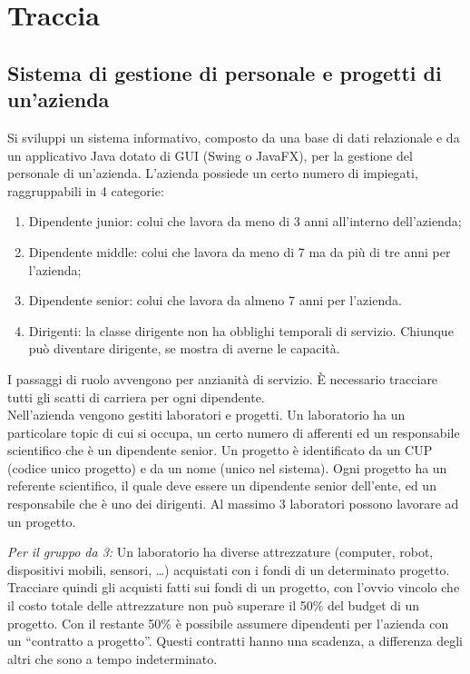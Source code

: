 \chapter[Traccia: Sistema di gestione di personale e progetti all'interno di un'azienda]{Traccia}
    \section*{Sistema di gestione di personale e progetti di un'azienda}
        Si sviluppi un sistema informativo, composto da una base di dati relazionale e da un applicativo Java dotato di GUI (Swing o JavaFX), per la gestione del personale di un’azienda. L’azienda possiede un certo numero di impiegati, raggruppabili in 4 categorie:
        \begin{enumerate}
            \item Dipendente junior: colui che lavora da meno di 3 anni all’interno dell’azienda;
            \item Dipendente middle: colui che lavora da meno di 7 ma da più di tre anni per l’azienda;
            \item Dipendente senior: colui che lavora da almeno 7 anni per l’azienda.
            \item Dirigenti: la classe dirigente non ha obblighi temporali di servizio. Chiunque può diventare dirigente, se mostra di averne le capacità.
        \end{enumerate}
        I passaggi di ruolo avvengono per anzianità di servizio. È necessario tracciare tutti gli scatti di carriera per ogni dipendente. \\
        Nell’azienda vengono gestiti laboratori e progetti. Un laboratorio ha un particolare topic di cui si occupa, un certo numero di afferenti ed un responsabile scientifico che è un dipendente senior. Un progetto è identificato da un CUP (codice unico progetto) e da un nome (unico nel sistema). Ogni progetto ha un referente scientifico, il quale deve essere un dipendente senior dell’ente, ed un responsabile che è uno dei dirigenti. Al massimo 3 laboratori possono lavorare ad un progetto.
        
        
        \textit{Per il gruppo da 3:} Un laboratorio ha diverse attrezzature (computer, robot, dispositivi mobili, sensori, …) acquistati con i fondi di un determinato progetto. Tracciare quindi gli acquisti fatti sui fondi di un progetto, con l’ovvio vincolo che il costo totale delle attrezzature non può superare il 50\% del budget di un progetto. Con il restante 50\% è possibile assumere dipendenti per l’azienda con un “contratto a progetto”. Questi contratti hanno una scadenza, a differenza degli altri che sono a tempo indeterminato.